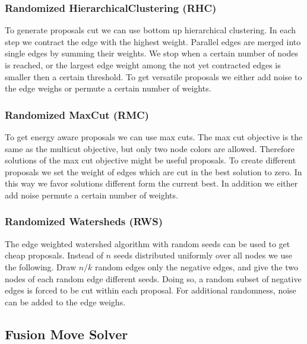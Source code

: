 \documentclass[10pt,twocolumn,letterpaper]{article}
\begin{document}
\subsubsection{Randomized HierarchicalClustering (RHC)}

To generate proposals cut we can use bottom up hierarchical clustering.
In each step we contract the edge with the highest weight.
Parallel edges are merged into single edges by summing their weights.
We stop when a certain number of nodes is reached, or the
largest edge weight among the not yet contracted edges is smaller then a certain threshold.
To get versatile proposals we either add noise 
to the edge weighs or permute a certain number of weights.


\subsubsection{Randomized MaxCut  (RMC)}

To get energy aware proposals we can use max cuts.
The max cut objective is the same as
the multicut objective, but only two 
node colors are allowed.
Therefore solutions of the max cut objective
might be useful proposals.
To create different proposals we set 
the weight of edges which are cut 
in the best solution to zero.
In this way we favor solutions 
different form the current best. 
In addition we either add noise permute a certain number of weights.


\subsubsection{Randomized Watersheds (RWS)}

The edge weighted watershed algorithm \cite{meyer_2013}
with random seeds can be used to get 
cheap proposals. Instead of $n$ seeds distributed uniformly
over all nodes we use the following.
Draw $n/k$ random edges only the negative edges, 
and give the two nodes of each random edge different seeds.
Doing so, a random subset of negative edges is forced
to be cut within each proposal.
For additional randomness, noise can be added to
the edge weighs.






\subsection{Fusion Move Solver}
\end{document}
